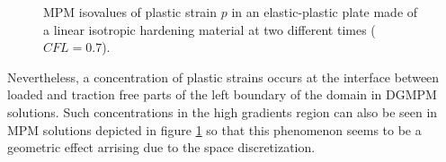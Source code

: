 \begin{figure}[h!]
  \centering
  
  \caption{MPM isovalues of plastic strain $p$ in an elastic-plastic plate made of a linear isotropic hardening material at two different times ($CFL=0.7$).}
  \label{fig:2dEP_mpm}
\end{figure}
Nevertheless, a concentration of plastic strains occurs at the interface between loaded and traction free parts of the left boundary of the domain in DGMPM solutions. 
Such concentrations in the high gradients region can also be seen in MPM solutions depicted in figure \ref{fig:2dEP_mpm} so that this phenomenon seems to be a geometric effect arrising due to the space discretization.
%   
%   
%   





